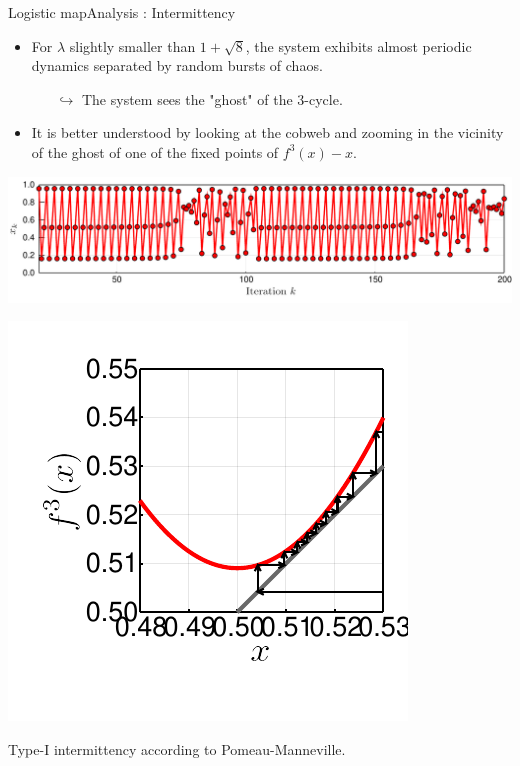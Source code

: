 \documentclass[usenames,dvipsnames,svgnames,10pt,aspectratio=169]{beamer}
\begin{document}
\begin{frame}[t, c]{Logistic map}{Analysis : Intermittency}
	\begin{minipage}{.68\textwidth}
		\begin{itemize}
			\item For \( \lambda \) slightly smaller than \(1 + \sqrt{8} \), the system exhibits almost periodic dynamics separated by random bursts of chaos.
			\begin{itemize}
				\item[\( \hookrightarrow \)] The system sees the "ghost" of the 3-cycle.
			\end{itemize}

			\item It is better understood by looking at the cobweb and zooming in the vicinity of the ghost of one of the fixed points of \(f^{3}(x)-x\).
		\end{itemize}

		\bigskip

		\includegraphics[width=\textwidth]{cycle_3_intermittency_time_series}
	\end{minipage}%
	\hfill
	\begin{minipage}{.28\textwidth}
		\includegraphics[width=\textwidth]{cycle_3_intermittency_close_up}

		{\small
			Type-I intermittency according to Pomeau-Manneville.
		}
	\end{minipage}

	\vspace{1cm}
\end{frame}
\end{document}
